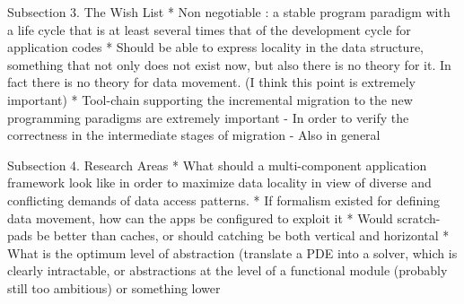 Subsection 3. The Wish List
* Non negotiable : a stable program paradigm with a life cycle that is
   at least several times that of the development cycle for
   application codes
* Should be able to express locality in the data structure, something
  that not only does not exist now, but also there is no theory for
  it. In fact there is no theory for data movement. (I think this
  point is extremely important)
* Tool-chain supporting the incremental migration to the new
  programming paradigms are extremely important 
  - In order to verify the correctness in the intermediate stages of
     migration  
  - Also in general 


Subsection 4. Research Areas
* What should a multi-component application framework look like in
   order to maximize data locality in view of diverse and conflicting
   demands of data access patterns. 
* If formalism existed for defining data movement, how can the apps
   be configured to exploit it
* Would scratch-pads be better than caches, or should catching be
   both vertical and horizontal
* What is the optimum level of abstraction (translate a PDE into a
   solver, which is clearly intractable, or abstractions at the level
   of a functional module (probably still too ambitious) or something
   lower 
